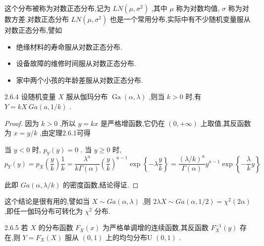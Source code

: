 这个分布被称为对数正态分布,记为 $ L N\left(\mu, \sigma^{2}\right) $ ,其中 $ \mu $ 称为对数均值, $ \sigma $ 称为对数方差.对数正态分布 $ L N\left(\mu, \sigma^{2}\right) $ 也是一个常用分布,实际中有不少随机变量服从对数正态分布,譬如

\begin{itemize}
	\item 绝缘材料的寿命服从对数正态分布.
	\item 设备故障的维修时间服从对数正态分布.
	\item 家中两个小孩的年龄差服从对数正态分布.
\end{itemize}

\begin{theorem}{}{2.6.4}
	设随机变量 $ X $ 服从伽玛分布 $ \operatorname{Ga}(\alpha, \lambda) $ ,则当 $ k>0 $ 时,有 $ Y=kX~Ga(a,1/k) $ .
\end{theorem}

\begin{proof}
	因为 $ k>0 $ ,所以 $ y=kx $ 是严格增函数,它仍在 $ (0,+\infty) $ 上取值,其反函数为 $ x=y/k $ ,由定理2.6.1可得
	
	当 $ y<0 $ 时, $ p_{Y}(y)=0 $ .
	当 $ y \geqslant 0 $ 时,
	\[
	p_{Y}(y)=p_{X}\left(\frac{y}{k}\right) \frac{1}{k}=\frac{\lambda^{a}}{k \Gamma(\alpha)}\left(\frac{y}{k}\right)^{a-1} \exp \left\{-\lambda \frac{y}{k}\right\}=\frac{(\lambda / k)^{a}}{\Gamma(\alpha)} y^{a-1} \exp \left\{-\frac{\lambda}{k} y\right\}
	\]
	
	此即 $ G a(\alpha, \lambda / k) $ 的密度函数,结论得证.
\end{proof}

这个结论是很有用的,譬如当 $ X \sim G a(\alpha, \lambda) $ ,则 $ 2 \lambda X \sim G a(\alpha, 1 / 2)= \chi^{2}(2 \alpha) $ ,即任一伽玛分布可转化为 $ \chi^{2} $ 分布.

\begin{theorem}{}{2.6.5}
	若 $ X $ 的分布函数 $ F_{X}(x) $ 为严格单调增的连续函数,其反函数 $ F_{X}^{-1}(y) $ 存在,则 $ Y=F_{X}(X) $ 服从 $ (0,1) $ 上的均匀分布U $ (0,1) $ .
\end{theorem}

